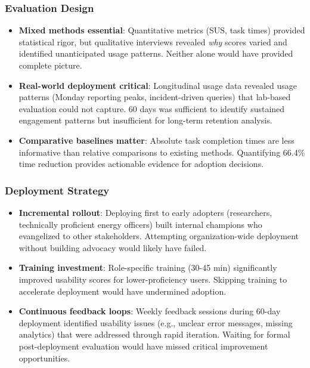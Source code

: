 \documentclass[acmlarge]{acmart}
\begin{document}
\subsubsection{Evaluation Design}

\begin{itemize}
    \item \textbf{Mixed methods essential}: Quantitative metrics (SUS, task times) provided statistical rigor, but qualitative interviews revealed \textit{why} scores varied and identified unanticipated usage patterns. Neither alone would have provided complete picture.
    
    \item \textbf{Real-world deployment critical}: Longitudinal usage data revealed usage patterns (Monday reporting peaks, incident-driven queries) that lab-based evaluation could not capture. 60 days was sufficient to identify sustained engagement patterns but insufficient for long-term retention analysis.
    
    \item \textbf{Comparative baselines matter}: Absolute task completion times are less informative than relative comparisons to existing methods. Quantifying 66.4\% time reduction provides actionable evidence for adoption decisions.
\end{itemize}

\subsubsection{Deployment Strategy}

\begin{itemize}
    \item \textbf{Incremental rollout}: Deploying first to early adopters (researchers, technically proficient energy officers) built internal champions who evangelized to other stakeholders. Attempting organization-wide deployment without building advocacy would likely have failed.
    
    \item \textbf{Training investment}: Role-specific training (30-45 min) significantly improved usability scores for lower-proficiency users. Skipping training to accelerate deployment would have undermined adoption.
    
    \item \textbf{Continuous feedback loops}: Weekly feedback sessions during 60-day deployment identified usability issues (e.g., unclear error messages, missing analytics) that were addressed through rapid iteration. Waiting for formal post-deployment evaluation would have missed critical improvement opportunities.
\end{itemize}
\end{document}
